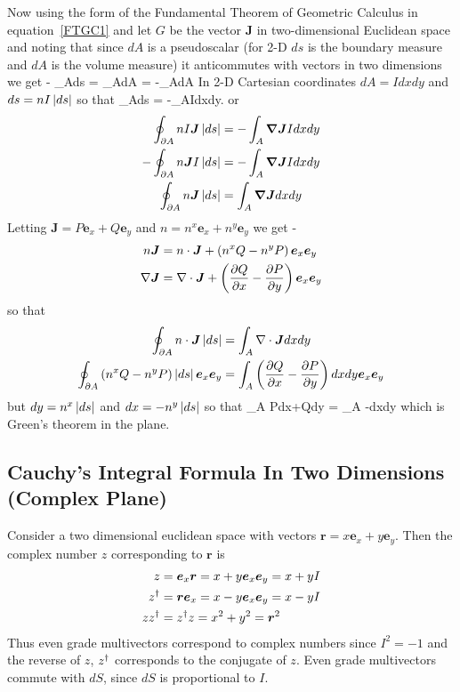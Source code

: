 Now using the form of the Fundamental Theorem of Geometric Calculus in equation~\ref{FTGC1} and let $G$ be the vector
$\bm{J}$ in two-dimensional Euclidean space and noting that since $dA$ is a pseudoscalar (for 2-D $ds$ is the boundary measure 
and $dA$ is the volume measure) it anticommutes with vectors in
two dimensions we get -
\be
\oint_{\partial A}ds  = \int_{A}\bm{\dot{\nabla}}dA = -\int_{A}dA
\ee
In 2-D Cartesian coordinates $dA = Idxdy$ and $ds = nI\left | {ds} \right |$ so that 
\be
\oint_{\partial A}ds = -\int_{A}Idxdy.
\ee
or
\begin{align}
\oint_{\partial A}nI\bm{J}\left | {ds} \right | &= -\int_{A}\bm{\nabla \bm{J}}Idxdy \nonumber \\
-\oint_{\partial A}n\bm{J}I\left | {ds} \right | &= -\int_{A}\bm{\nabla \bm{J}}Idxdy \\
\oint_{\partial A}n\bm{J}\left | {ds} \right | &= \int_{A}\bm{\nabla \bm{J}}dxdy
\end{align}
Letting $\bm{J} = P\bm{e}_{x}+Q\bm{e}_{y}$ and $n=n^{x}\bm{e}_{x}+n^{y}\bm{e}_{y}$ we get -
\begin{align}
n\bm{J} &= n\cdot\bm{J}+\left ( {n^{x}Q-n^{y}P} \right )\bm{e}_{x}\bm{e}_{y} \\
\nabla \bm{J} &= \nabla\cdot\bm{J}+\left ( {\displaystyle\frac{\partial{Q}}{\partial{x}}-\displaystyle\frac{\partial{P}}{\partial{y}}} \right )\bm{e}_{x}\bm{e}_{y}
\end{align}
so that
\begin{align}
\oint_{\partial A}n\cdot\bm{J}\left | {ds} \right | &= \int_{A}\nabla\cdot\bm{J}dxdy \\
\oint_{\partial A}\left ( {n^{x}Q-n^{y}P} \right )\left | {ds} \right |\bm{e}_{x}\bm{e}_{y} &= \int_{A}\left ( {\displaystyle\frac{\partial{Q}}{\partial{x}}-\displaystyle\frac{\partial{P}}{\partial{y}}} \right ) dxdy\bm{e}_{x}\bm{e}_{y}
\end{align}
but $dy = n^{x}\left | {ds} \right |$ and $dx = -n^{y}\left | {ds} \right |$ so that
\be
\oint_{\partial A} Pdx+Qdy = \int_{A} \lp{}-\rp dxdy
\ee
which is Green's theorem in the plane.

\subsection{Cauchy's Integral Formula In Two Dimensions (Complex Plane)}
Consider a two dimensional euclidean space with vectors $\bm{r} = x\bm{e}_{x}+y\bm{e}_{y}$.  Then the complex number $z$ corresponding to $\bm{r}$ is
\begin{align}
 z  &= \bm{e}_{x}\bm{r} = x + y\bm{e}_{x}\bm{e}_{y} = x + yI \\
 z^{\dagger} &= \bm{r}\bm{e}_{x} = x - y\bm{e}_{x}\bm{e}_{y} = x - yI \\
 zz^{\dagger } &= z^{\dagger }z = x^{2}+y^{2} = \bm{r}^{2}
\end{align}
Thus even grade multivectors correspond to complex numbers since $I^{2}=-1$ and the reverse of $z$, $z^{\dagger}$ corresponds to the conjugate of $z$.
Even grade multivectors commute with $dS$, since $dS$ is proportional to $I$.

